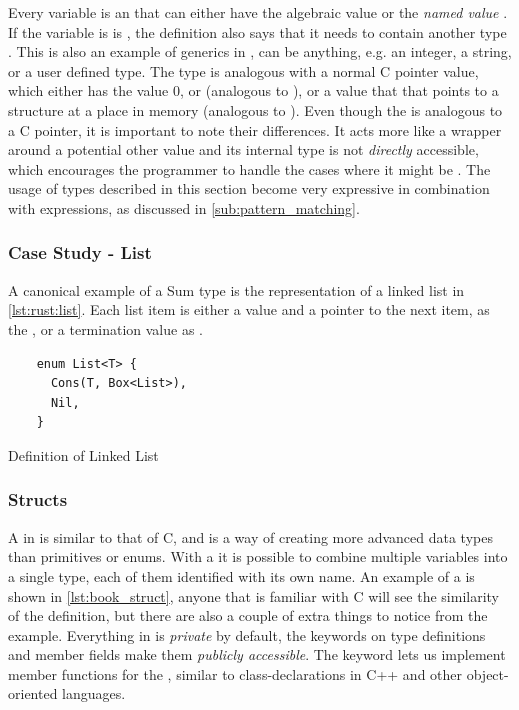 Every  variable is an \enum that can either have the algebraic value  or the \emph{named value} .
If the variable is is , the definition also says that it needs to contain another type .
This is also an example of generics in \rust,  can be anything, e.g. an integer, a string, or a user defined type.
The  type is analogous with a normal C pointer value, which either has the value 0, or  (analogous to ), or a value that that points to a structure at a place in memory (analogous to ).
Even though the  is analogous to a C pointer, it is important to note their differences.
It acts more like a wrapper around a potential other value and its internal type is not \emph{directly} accessible, which encourages the programmer to handle the cases where it might be .
The usage of \enum types described in this section become very expressive in combination with  expressions, as discussed in \autoref{sub:pattern_matching}.

\subsubsection{Case Study - List}

A canonical example of a Sum type is the representation of a linked list in \autoref{lst:rust:list}.
Each list item is either a value and a pointer to the next item, as the , or a termination value as .

\begin{listing}[H]
  \begin{verbatim}
    enum List<T> {
      Cons(T, Box<List>),
      Nil,
    }
  \end{verbatim}
  \caption{Definition of Linked List}
  \label{lst:rust:list}
\end{listing}

\subsubsection{Structs}
\label{ssub:structs}

A  in \rust is similar to that of C, and is a way of creating more advanced data types than primitives or enums.
With a  it is possible to combine multiple variables into a single type, each of them identified with its own name.
An example of a  is shown in \autoref{lst:book_struct}, anyone that is familiar with C will see the similarity of the  definition, but there are also a couple of extra things to notice from the example.
Everything in \rust is \emph{private} by default, the  keywords on type definitions and member fields make them \emph{publicly accessible}.
The  keyword lets us implement member functions for the , similar to class-declarations in C++ and other object-oriented languages.


